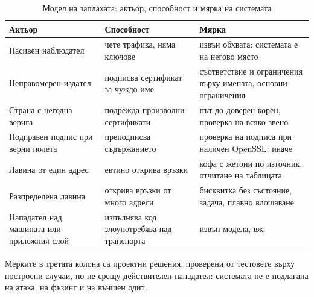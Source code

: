 \begin{table}[htbp]
\caption{Модел на заплахата: актьор, способност и мярка на системата}
\label{tab:threat}
\centering
\fontsize{10}{12}\selectfont
\begin{tabular}{L{3.7cm} L{4.4cm} L{6.6cm}}
\toprule
Актьор & Способност & Мярка \\
\midrule
Пасивен наблюдател & чете трафика, няма ключове &
извън обхвата: системата е на негово място \\
Неправомерен издател & подписва сертификат за чуждо име &
съответствие и ограничения върху имената, основни ограничения \\
Страна с негодна верига & подрежда произволни сертификати &
път до доверен корен, проверка на всяко звено \\
Подправен подпис при верни полета & преподписва съдържанието &
проверка на подписа при наличен OpenSSL; иначе  \\
Лавина от един адрес & евтино открива връзки &
кофа с жетони по източник, отчитане на таблицата \\
Разпределена лавина & открива връзки от много адреси &
бисквитка без състояние, задача, плавно влошаване \\
Нападател над машината или приложния слой & изпълнява код, злоупотребява над транспорта &
извън модела, вж. \cite{owasp_top10_2021} \\
\bottomrule
\end{tabular}
\end{table}

Мерките в третата колона са проектни решения, проверени от тестовете върху построени случаи, но не
срещу действителен нападател: системата не е подлагана на атака, на фъзинг и на външен одит.
